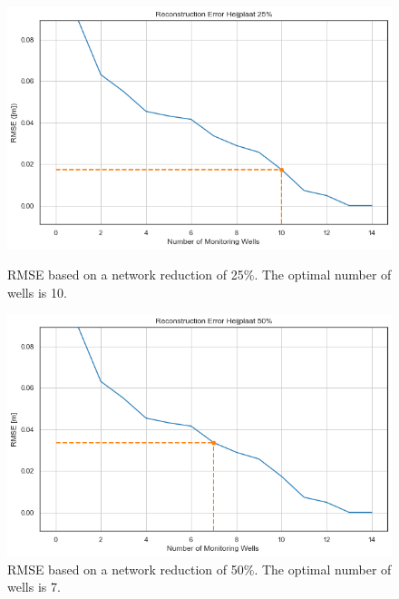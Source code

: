 \begin{figure}[htbp]
    \centering
    \begin{minipage}{0.45\linewidth}
        \includegraphics[width=\linewidth]{frontmatter/Heijplaat-fig/25heij.png}
        \caption{RMSE based on a network reduction of 25\%. The optimal number of wells is 10.}
        \label{heij25}
    \end{minipage}
    \hfill
    \begin{minipage}{0.45\linewidth}
        \includegraphics[width=\linewidth]{frontmatter/Heijplaat-fig/50heij.png}
        \caption{RMSE based on a network reduction of 50\%. The optimal number of wells is 7.}
        \label{heij50}
    \end{minipage}
\end{figure}

